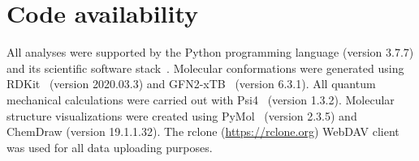 \section*{Code availability}

All analyses were supported by the Python programming language (version 3.7.7) and its scientific software stack~\cite{harris2020array}. Molecular conformations were generated using RDKit~\cite{rdkit} (version 2020.03.3) and GFN2-xTB~\cite{grimme2017robust, bannwarth2019gfn2, pracht2019robust, grimme2019exploration, bannwarth2020extended} (version 6.3.1). All quantum mechanical calculations were carried out with Psi4~\cite{smith2020psi4} (version 1.3.2). Molecular structure visualizations were created using PyMol~\cite{PyMOL} (version 2.3.5) and ChemDraw (version 19.1.1.32). The rclone (\url{https://rclone.org}) WebDAV client was used for all data uploading purposes.
